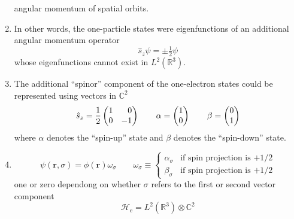 \begin{enumerate}
        angular momentum of spatial orbits.
    \item
        In other words, the one-particle states were eigenfunctions of an
        additional angular momentum operator
        \begin{equation}
            \hat{s}_z
            \psi
            =
            \pm
            \tfrac{1}{2}
            \psi
        \end{equation}
        whose eigenfunctions cannot exist in \(L^2(\mathbb{R}^3)\).
    \item
        The additional ``spinor'' component of the one-electron states could be
        represented using vectors in \(\mathbb{C}^2\)
        \begin{equation}
            \hat{s}_z
            =
            \frac{1}{2}
            \begin{pmatrix}
                1 & \hphantom{+}0 \\
                0 & -1
            \end{pmatrix}
            \qquad
            \alpha
            =
            \begin{pmatrix}
                1 \\ 0
            \end{pmatrix}
            \qquad
            \beta
            =
            \begin{pmatrix}
                0 \\ 1
            \end{pmatrix}
        \end{equation}
        where \(\alpha\) denotes the ``spin-up'' state and \(\beta\) denotes the
        ``spin-down'' state.
    \item
        \begin{equation}
            \psi(\mathbf{r}, \sigma)
            =
            \phi(\mathbf{r})
            \omega_\sigma
            \qquad
            \omega_\sigma
            \equiv
            \left\{
                \begin{array}{cl}
                    \alpha_{\sigma}
                    &
                    \text{if spin projection is \(+1/2\)}
                    \\[10pt]
                    \beta_{\sigma}
                    &
                    \text{if spin projection is \(+1/2\)}
                \end{array}
            \right.
        \end{equation}
        one or zero dependong on whether \(\sigma\) refers to the first or
        second vector component
        \begin{equation}
            \mathcal{H}_\mathrm{e}
            =
            L^2(\mathbb{R}^3)
            \otimes
            \mathbb{C}^2
        \end{equation}
\end{enumerate}


